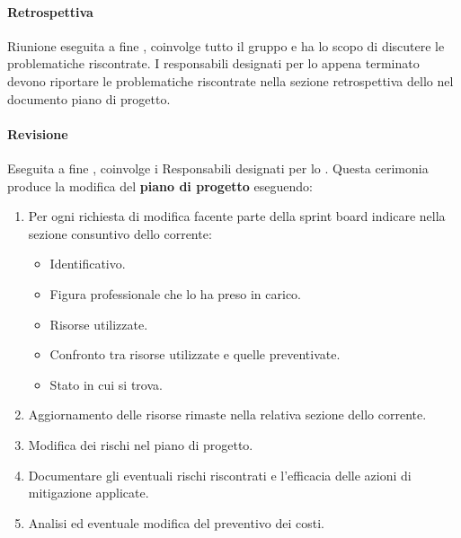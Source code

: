 \paragraph{Retrospettiva}
Riunione eseguita a fine , coinvolge tutto il gruppo e ha lo scopo di discutere le problematiche riscontrate.
I responsabili designati per lo  appena terminato devono riportare le problematiche riscontrate nella sezione retrospettiva dello  nel documento piano di progetto.


\paragraph{Revisione}
Eseguita a fine , coinvolge i Responsabili designati per lo .
Questa cerimonia produce la modifica del \textbf{piano di progetto} eseguendo:
\begin{enumerate}
    \item Per ogni richiesta di modifica facente parte della sprint board indicare nella sezione consuntivo dello  corrente:
    \begin{itemize}
        \item Identificativo.
        \item Figura professionale che lo ha preso in carico.
        \item Risorse utilizzate.
        \item Confronto tra risorse utilizzate e quelle preventivate.
        \item Stato in cui si trova.
    \end{itemize}
    \item Aggiornamento delle risorse rimaste nella relativa sezione dello  corrente.
    \item Modifica dei rischi nel piano di progetto.
    \item Documentare gli eventuali rischi riscontrati e l'efficacia delle azioni di mitigazione applicate.
    \item Analisi ed eventuale modifica del preventivo dei costi.
\end{enumerate}

